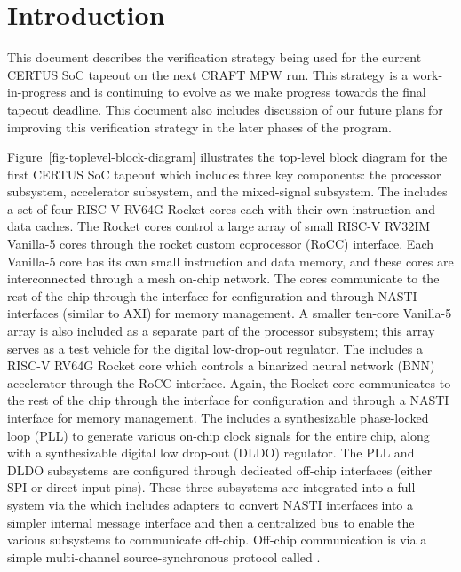 
\section{Introduction}

This document describes the verification strategy being used for the
current CERTUS SoC tapeout on the next CRAFT MPW run. This strategy is a
work-in-progress and is continuing to evolve as we make progress towards
the final tapeout deadline. This document also includes discussion of our
future plans for improving this verification strategy in the later phases
of the program.



Figure~\ref{fig-toplevel-block-diagram} illustrates the top-level block
diagram for the first CERTUS SoC tapeout which includes three key
components: the processor subsystem, accelerator subsystem, and the
mixed-signal subsystem. The  includes a set of
four RISC-V RV64G Rocket cores each with their own instruction and data
caches. The Rocket cores control a large array of small RISC-V RV32IM
Vanilla-5 cores through the rocket custom coprocessor (RoCC) interface.
Each Vanilla-5 core has its own small instruction and data memory, and
these cores are interconnected through a mesh on-chip network. The cores
communicate to the rest of the chip through the  interface
for configuration and through NASTI interfaces (similar to AXI) for
memory management. A smaller ten-core Vanilla-5 array is also included as
a separate part of the processor subsystem; this array serves as a test
vehicle for the digital low-drop-out regulator. The  includes a RISC-V RV64G Rocket core which controls a
binarized neural network (BNN) accelerator through the RoCC interface.
Again, the Rocket core communicates to the rest of the chip through the
 interface for configuration and through a NASTI interface
for memory management. The  includes a
synthesizable phase-locked loop (PLL) to generate various on-chip clock
signals for the entire chip, along with a synthesizable digital low
drop-out (DLDO) regulator. The PLL and DLDO subsystems are configured
through dedicated off-chip interfaces (either SPI or direct input pins).
These three subsystems are integrated into a full-system via the
 which includes adapters to convert NASTI interfaces
into a simpler internal message interface and then a centralized bus to
enable the various subsystems to communicate off-chip. Off-chip
communication is via a simple multi-channel source-synchronous protocol
called .

